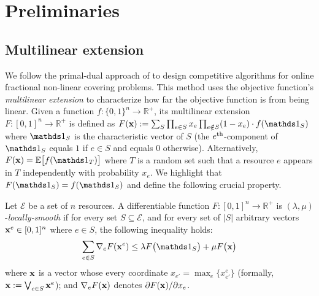 


\section{Preliminaries} \label{sec-prelim}

\subsection{Multilinear extension}

We follow the primal-dual approach of \cite{Thang20:Online-Primal-Dual} to design competitive algorithms for online fractional non-linear covering problems. This method uses the objective function's \emph{multilinear extension} to characterize how far the objective function is from being linear. Given a function $f: \{0,1\}^{n} \rightarrow \mathbb{R}^{+}$, its multilinear extension $F: [0,1]^{n} \rightarrow \mathbb{R}^{+}$
is defined as $F(\vect{x}) := \sum_{S} \prod_{e \in S} x_{e} \prod_{e \notin S} (1 - x_{e}) \cdot f(\one_{S})$
where $\one_{S}$ is the characteristic vector of $S$ (the $e^{\textnormal{th}}$-component of
$\one_{S}$ equals $1$ if $e \in S$ and equals 0 otherwise).
Alternatively, $F(\vect{x}) = \mathbb{E} \bigl[ f(\one_{T})\bigr]$ where $T$ is a random set
such that a resource $e$ appears in $T$ independently with probability $x_{e}$. We highlight that $F(\one_{S}) = f(\one_{S})$ and define the following crucial property.


\begin{definition}	\label{def:min-local-smooth}
Let $\mathcal{E}$ be a set of $n$ resources.
A differentiable function $F: [0,1]^{n} \rightarrow \mathbb{R}^{+}$ is $(\lambda,\mu)$-\emph{locally-smooth}
if for every set $S \subseteq \mathcal{E}$, and for every set of $|S|$ arbitrary vectors $\mathbf{x}^{e} \in [0,1]^{n}$ where $e \in S$, the following inequality holds:
\begin{equation*}	\label{eq:min-local-smooth}
\sum_{e \in S} \nabla_{e} F(\vect{x}^{e}) \leq \lambda F\bigl( \one_{S} \bigr) + \mu F\bigl( \vect{x} \bigr)
\end{equation*}
where $\mathbf{x}$ is a vector whose every coordinate $x_{e'} = \max_{e}\{x^{e}_{e'}\}$ (formally, $\mathbf{x} := \bigvee_{e \in S} \mathbf{x}^{e}$);
and $\nabla_{e} F(\mathbf{x})$ denotes $\partial F(\mathbf{x})/\partial x_{e}$.
\end{definition}

